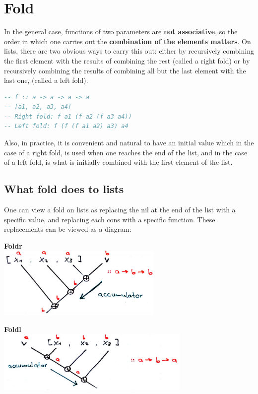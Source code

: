 \section{Fold}

In the general case, functions of two parameters are \textbf{not associative}, so the order in which one carries out the \textbf{combination of the elements matters}. On lists, there are two obvious ways to carry this out: either by recursively combining the first element with the results of combining the rest (called a right fold) or by recursively combining the results of combining all but the last element with the last one, (called a left fold). 

\begin{lstlisting}[language=Haskell]
-- f :: a -> a -> a -> a
-- [a1, a2, a3, a4]
-- Right fold: f a1 (f a2 (f a3 a4))
-- Left fold: f (f (f a1 a2) a3) a4
\end{lstlisting}

Also, in practice, it is convenient and natural to have an initial value which in the case of a right fold, is used when one reaches the end of the list, and in the case of a left fold, is what is initially combined with the first element of the list.

\subsection{What fold does to lists}
One can view a fold on lists as replacing the nil at the end of the list with a specific value, and replacing each cons with a specific function. These replacements can be viewed as a diagram: 

\begin{center}
  \textbf{Foldr} \\
  \includegraphics[width=0.6\textwidth]{figures/foldr-overview.png}
\end{center}

\begin{center}
  \textbf{Foldl} \\
  \includegraphics[width=0.7\textwidth]{figures/foldl.png}
\end{center}

